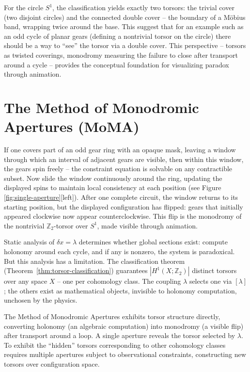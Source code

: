 \documentclass[11pt]{amsart}  %
\theoremstyle{plain}
\theoremstyle{definition}
\theoremstyle{remark}
\newcommand{\coboundary}{\delta} %
\newcommand{\Z}{\mathbb{Z}} %
\newcommand{\coupling}{\lambda} %
\begin{document}
For the circle $S^1$, the classification yields exactly two torsors: the trivial cover (two disjoint circles) and the connected double cover -- the boundary of a M\"obius band, wrapping twice around the base. This suggest that for an example such as an odd cycle of planar gears (defining a nontrivial torsor on the circle) there should be a way to ``see'' the torsor via a double cover. This perspective -- torsors as twisted coverings, monodromy measuring the failure to close after transport around a cycle -- provides the conceptual foundation for visualizing paradox through animation.

\section{The Method of Monodromic Apertures (MoMA)}
\label{sec:MoMA}

If one covers part of an odd gear ring with an opaque mask, leaving a window through which an interval of adjacent gears are visible, then within this window, the gears spin freely -- the constraint equation is solvable on any contractible subset. Now slide the window continuously around the ring, updating the displayed spins to maintain local consistency at each position (see Figure \ref{fig:single-aperture}[left]). After one complete circuit, the window returns to its starting position, but the displayed configuration has flipped: gears that initially appeared clockwise now appear counterclockwise. This flip is the monodromy of the nontrivial $\Z_2$-torsor over $S^1$, made visible through animation.

Static analysis of $\coboundary x = \coupling$ determines whether global sections exist: compute holonomy around each cycle, and if any is nonzero, the system is paradoxical. But this analysis has a limitation. The classification theorem (Theorem~\ref{thm:torsor-classification}) guarantees $|H^1(X; \Z_2)|$ distinct torsors over any space $X$ -- one per cohomology class. The coupling $\coupling$ selects one via $[\coupling]$; the others exist as mathematical objects, invisible to holonomy computation, unchosen by the physics.

The Method of Monodromic Apertures exhibits torsor structure directly, converting holonomy (an algebraic computation) into monodromy (a visible flip) after transport around a loop. A single aperture reveals the torsor selected by $\coupling$. To exhibit the ``hidden'' torsors corresponding to other cohomology classes requires multiple apertures subject to observational constraints, constructing new torsors over configuration space.
\end{document}
